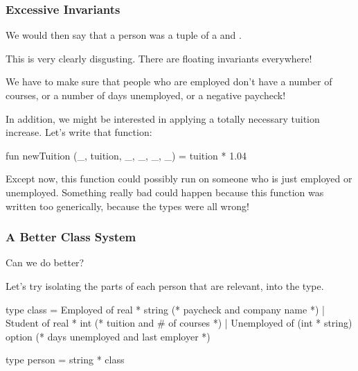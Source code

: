 \documentclass[aspectratio=169]{beamer}
\begin{document}
\begin{frame}[fragile]
  \frametitle{Excessive Invariants}

  We would then say that a person was a tuple of a  and .

  \pause
  \vspace{\fill}

  This is very clearly disgusting. There are floating invariants everywhere! 

  \pause
  \vspace{\fill}

  We have to make sure that people who are employed don't have a number of
  courses, or a number of days unemployed, or a negative paycheck!  

  \pause
  \vspace{\fill}

  In addition, we might be interested in applying a totally necessary tuition
  increase. Let's write that function:

  \begin{codeblock}
    fun newTuition (_, tuition, _, _, _, _) = tuition * 1.04
  \end{codeblock}

  \pause
  \vspace{\fill}

  Except now, this function could possibly run on someone who is just
  employed or unemployed. Something really bad could happen because this
  function was written too generically, because the types were all wrong!
\end{frame}

\begin{frame}[fragile]
  \frametitle{A Better Class System}

  Can we do better?

  \pause
  \vspace{\fill}

  Let's try isolating the parts of each person that are relevant, into
  the  type.

  \pause
  \vspace{\fill}

  \begin{codeblock}
    type class =
        Employed of real * string  
          (* paycheck and company name *)
      | Student of real * int 
          (* tuition and # of courses *)
      | Unemployed of (int * string) option
          (* days unemployed and last employer *)

    type person = string * class
  \end{codeblock}
\end{frame}
\end{document}
